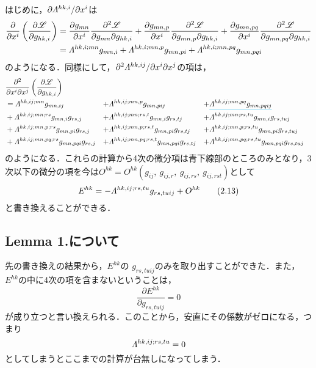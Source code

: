 \documentclass[main]{subfiles}
\begin{document}
はじめに，\(\partial \varLambda^{hk,i} / \partial x^i\)は
\begin{align*}
    \frac{\partial}{\partial x^{i}}\left(\frac{\partial \mathscr{L}}{\partial g_{hk,i}}\right) & = \frac{\partial g_{m n}}{\partial x^{i}} \frac{\partial^{2} \mathscr{L}}{\partial g_{m n} \partial g_{h k, i}}+\frac{\partial g_{m n, p}}{\partial x^{i}} \frac{\partial^{2} \mathscr{L}}{\partial g_{m n, p} \partial g_{h k, i}} +\frac{\partial g_{m n, p q}}{\partial x^{i}} \frac{\partial^{2} \mathscr{L}}{\partial g_{m n, p q} \partial g_{h k, i}} \\
    & = \varLambda^{hk,i;mn} g_{mn,i} +\varLambda^{hk,i;mn,p} g_{mn,pi}+\varLambda^{hk,i;mn,pq} g_{mn,pqi}
\end{align*}
のようになる．同様にして，\(\partial^2 \varLambda^{hk,ij} / \partial x^i \partial x^j\)の項は，
\begin{align*}
    & \frac{\partial^2}{\partial x^{i}\partial x^{j}}\left(\frac{\partial \mathscr{L}}{\partial g_{hk,i}}\right)\\
    & = \varLambda^{hk,ij;mn} g_{mn,ij}& + & \varLambda^{hk,ij;mn,p} g_{mn,pij} & + & \color{cyan}{
    \underline{\textcolor{black}{
    \varLambda^{hk,ij;mn,pq} g_{mn,pqij}
    }}}\\
    & + \varLambda^{hk,ij;mn;rs} g_{mn,i}g_{rs,j}& + & \varLambda^{hk,ij;mn;rs,t} g_{mn,i}g_{rs,tj}      & + & \varLambda^{hk,ij;mn;rs,tu} g_{mn,i}g_{rs,tuj}      \\
    & + \varLambda^{hk,ij;mn,p;rs} g_{mn,pi}g_{rs,j} & + & \varLambda^{hk,ij;mn,p;rs,t} g_{mn,pi}g_{rs,tj}   & + & \varLambda^{hk,ij;mn,p;rs,tu} g_{mn,pi}g_{rs,tuj}   \\
    & + \varLambda^{hk,ij;mn,pq;rs} g_{mn,pqi}g_{rs,j}& + & \varLambda^{hk,ij;mn,pq;rs,t} g_{mn,pqi}g_{rs,tj} & + & \varLambda^{hk,ij;mn,pq;rs,tu} g_{mn,pqi}g_{rs,tuj}
\end{align*}
のようになる．これらの計算から4次の微分項は青下線部のところのみとなり，3次以下の微分の項を今は\(O^{hk} = O^{hk}(g_{ij},\: g_{ij,r}, \: g_{ij,rs},\: g_{ij,rst})\)として
\begin{equation*}
    E^{hk} =- \varLambda^{hk,ij;rs,tu} g_{rs,tuij}+O^{hk}
    \tag{2.13} \label{EL2}
\end{equation*}
と書き換えることができる．

\subsection{Lemma 1.について}
先の書き換えの結果から，\(E^{hk}\)の \(g_{rs,tuij}\)のみを取り出すことができた．また，\(E^{hk}\)の中に4次の項を含まないということは，
\begin{equation*}
    \dfrac{\partial E^{hk}}{\partial g_{rs,tuij} } = 0
\end{equation*}
が成り立つと言い換えられる．このことから，安直にその係数がゼロになる，つまり
\begin{equation*}
    \varLambda^{hk,ij;rs,tu}=0
\end{equation*}
としてしまうとここまでの計算が台無しになってしまう．
\end{document}
